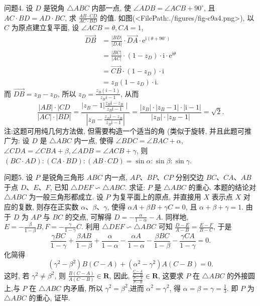 问题4. 设 $D$ 是锐角 $\triangle A B C$ 内部一点, 使 $\angle A D B=\angle A C B+90^{\circ}$, 且 $A C \cdot B D= A D \cdot B C$, 求 $\frac{A B \cdot C D}{A C \cdot B D}$ 的值.
如图(<FilePath:./figures/fig-c9a4.png>), 以 $C$ 为原点建立复平面, 设 $\angle A C B= \theta, C A=1$,
$$
\begin{aligned}
\overrightarrow{D B} & =\frac{|B D|}{|D A|} \cdot \overrightarrow{D A} \cdot \mathrm{e}^{\mathrm{i}\left(\theta+90^{\circ}\right)} \\
& =\frac{|B C|}{|A C|} \cdot\left(1-z_D\right) \cdot \mathrm{i} \cdot \mathrm{e}^{\mathrm{i} \theta} \\
& =\overrightarrow{C B} \cdot\left(1-z_D\right) \cdot \mathrm{i} \\
& =z_B\left(1-z_D\right) \cdot \mathrm{i} .
\end{aligned}
$$
而 $\overrightarrow{D B}=z_B-z_D$, 所以 $z_D=\frac{z_B(i-1)}{z_B i-1}$, 从而
$$
\frac{|A B| \cdot \mid C D}{|A C| \cdot|B D|}=\frac{\left|z_B-1\right| \frac{z_B \mathrm{i}-z_B}{z_B \mathrm{i}-1} \mid}{\left|z_B-\frac{z_B \mathrm{i}-z_B}{z_B \mathrm{i}-1}\right|}=\frac{\left|z_B\right| \cdot\left|z_B-1\right| \cdot|\mathrm{i}-1|}{\left|z_B\right| \cdot\left|z_B-1\right|}=\sqrt{2} .
$$
注:这题可用纯几何方法做, 但需要构造一个适当的角 (类似于旋转, 并且此题可推广为: 设 $D$ 是 $\triangle A B C$ 内一点, 使得 $\angle B D C=\angle B A C+\alpha$, $\angle C D A=\angle C B A+\beta, \angle A D B=\angle A C B+\gamma$, 则 $(B C \cdot A D):(C A \cdot B D): (A B \cdot C D)=\sin \alpha: \sin \beta: \sin \gamma$.



问题5. 设 $P$ 是锐角三角形 $A B C$ 内一点, $A P 、 B P 、 C P$ 分别交边 $B C 、 C A 、 A B$ 于点 $D 、 E 、 F$, 已知 $\triangle D E F \backsim \triangle A B C$. 求证: $P$ 是 $\triangle A B C$ 的重心.
本题的结论对 $\triangle A B C$ 为一般三角形都成立.
设 $P$ 为复平面上的原点, 并直接用 $X$ 表示点 $X$ 对应的复数, 则存在正实数 $\alpha 、 \beta 、 \gamma$, 使得 $\alpha A+\beta B+\gamma C=0$, 且 $\alpha+\beta+\gamma=1$.
由于 $D$ 为 $A P$ 与 $B C$ 的交点, 可解得 $D=-\frac{\alpha}{1-\alpha}-A$. 同样地, $E= -\frac{\beta}{1-\beta} B, F=-\frac{\gamma}{1-\gamma} C$. 利用 $\triangle D E F \backsim \triangle A B C$ 可知 $\frac{D-E}{A-B}=\frac{E-F}{B-C}$, 于是
$$
\frac{\gamma B C}{1-\gamma}+\frac{\beta A B}{1-\beta}+\frac{\alpha}{1-\alpha}-\frac{\alpha A}{1-\alpha}-\frac{\beta B C}{1-\beta}-\frac{\gamma C A}{1-\gamma}=0 .
$$
化简得
$$
\left(\gamma^2-\beta^2\right) B(C-A)+\left(\alpha^2-\gamma^2\right) A(C-B)=0 .
$$
这时, 若 $\gamma^2 \neq \beta^2$, 则 $\frac{B(C-A)}{A(C-B)} \in \mathbf{R}$, 因此, $\frac{\frac{C-A}{C-B}}{\frac{P-A}{P-B}} \in \mathbf{R}$, 这要求 $P$ 在 $\triangle A B C$ 的外接圆上,与 $P$ 在 $\triangle A B C$ 内矛盾, 所以 $\gamma^2=\beta^2$,进而 $\alpha^2=\gamma^2$, 得 $\alpha=\beta=\gamma=\frac{1}{3}$.
即 $P$ 为 $\triangle A B C$ 的重心, 证毕.



